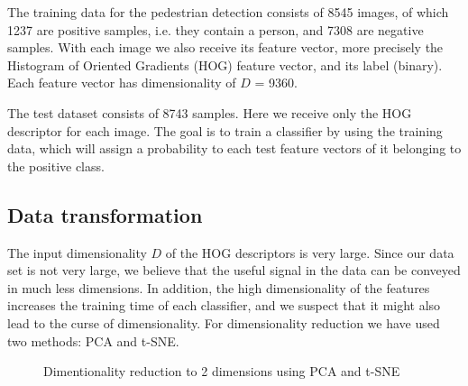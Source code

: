\documentclass{article} %
\begin{document}
The training data for the pedestrian detection consists of 8545 images, of which 
1237 are positive samples, i.e. they contain a person, and 7308 are negative samples. 
With each image we also receive its feature vector, more precisely the Histogram of 
Oriented Gradients (HOG) feature vector, and its label (binary). Each feature vector 
has dimensionality of $D$ = 9360.

The test dataset consists of 8743 samples. Here we receive only the HOG descriptor for each image.
 The goal is to train a classifier by using
the training data, which will assign a probability to each test feature vectors of it belonging to 
the positive class. 


\subsection{Data transformation}

The input dimensionality $D$ of the HOG descriptors is very large. 
Since our data set is not very large, we believe that the useful 
signal in the data can be conveyed in much less dimensions. 
In addition, the high dimensionality of the features increases 
the training time of each classifier, and we suspect that 
it might also lead to the curse of dimensionality.
 For dimensionality reduction we have used two methods: PCA and t-SNE.

\begin{figure}[!t]
	\center
	\hfill
	\caption{Dimentionality reduction to 2 dimensions using PCA and t-SNE}
\end{figure}
\end{document}

